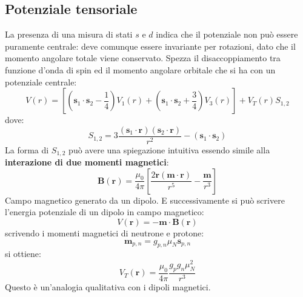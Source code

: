 \subsection{Potenziale tensoriale}
La presenza di una misura di stati $s$ e $d$ indica che il potenziale non può essere puramente centrale: deve comunque essere invariante per rotazioni, dato che il momento angolare totale viene conservato. Spezza il disaccoppiamento tra funzione d'onda di spin ed il momento angolare orbitale che si ha con un potenziale centrale:
\begin{equation*}
    V(r)=\left[\left(\mathbf{s}_1\cdot\mathbf{s}_2-\frac{1}{4}\right)V_1(r)+\left(\mathbf{s}_1\cdot\mathbf{s}_2+\frac{3}{4}\right)V_3(r)\right]+V_T(r)S_{1,2}
\end{equation*}
dove:
\begin{equation*}
    S_{1,2}=3\frac{(\mathbf{s}_1\cdot\mathbf{r})(\mathbf{s}_2\cdot\mathbf{r})}{r^2}-(\mathbf{s}_1\cdot\mathbf{s}_2)
\end{equation*}
La forma di $S_{1,2}$ può avere una spiegazione intuitiva essendo simile alla \textbf{interazione di due momenti magnetici}:
\begin{equation*}
    \mathbf{B}(\mathbf{r})=\frac{\mu_0}{4\pi}\left[\frac{2\mathbf{r(\mathbf{m}\cdot\mathbf{r})}}{r^5}-\frac{\mathbf{m}}{r^3}\right]
\end{equation*}
Campo magnetico generato da un dipolo. E successivamente si può scrivere l'energia potenziale di un dipolo in campo magnetico:
\begin{equation*}
    V(\mathbf{r})=-\mathbf{m}\cdot\mathbf{B}(\mathbf{r})
\end{equation*}
scrivendo i momenti magnetici di neutrone e protone:
\begin{equation*}
    \mathbf{m}_{p,n}=g_{p,n}\mu_N\mathbf{s}_{p,n}
\end{equation*}
si ottiene:
\begin{equation*}
    V_{T}(\mathbf{r})=\frac{\mu_0}{4\pi}\frac{g_pg_n\mu_N^2}{r^3}
\end{equation*}
Questo è un'analogia qualitativa con i dipoli magnetici.
